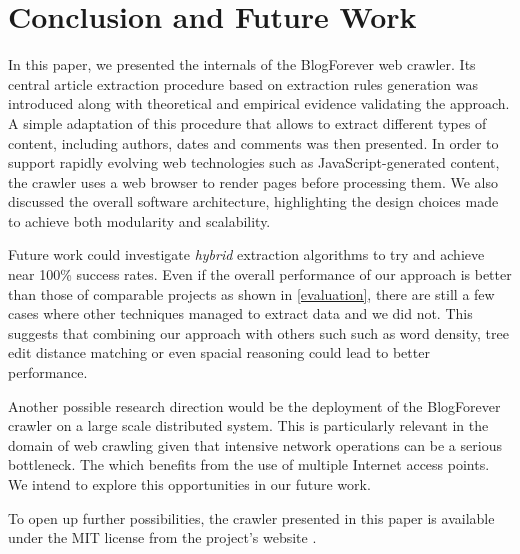 \section{Conclusion and Future Work}
In this paper, we presented the internals of the BlogForever web crawler. Its central article extraction procedure based on extraction rules generation was introduced along with theoretical and empirical evidence validating the approach. A simple adaptation of this procedure that allows to extract different types of content, including authors, dates and comments was then presented. In order to support rapidly evolving web technologies such as JavaScript-generated content, the crawler uses a web browser to render pages before processing them. We also discussed the overall software architecture, highlighting the design choices made to achieve both modularity and scalability.

Future work could investigate \emph{hybrid} extraction algorithms to try and achieve near 100\% success rates. Even if the overall performance of our approach is better than those of comparable projects as shown in \autoref{evaluation}, there are still a few cases where other techniques managed to extract data and we did not. This suggests that combining our approach with others such such as word density, tree edit distance matching or even spacial reasoning could lead to better performance.

Another possible research direction would be the deployment of the BlogForever crawler on a large scale distributed system. This is particularly relevant in the domain of web crawling given that intensive network operations can be a serious bottleneck. The which benefits from the use of multiple Internet access points. We intend to explore this opportunities in our future work.


To open up further possibilities, the crawler presented in this paper is available under the MIT license from the project's website \cite{blogforevercrawler}. 
